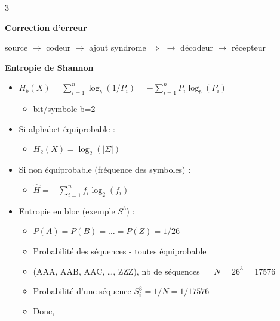 \documentclass[9pt, a4paper, twoside]{article}
\begin{document}
\begin{multicols}{3}
\begin{flushleft}
    \scriptsize \textbf{Correction d'erreur}
\end{flushleft}

\begin{flushleft}
    \scriptsize source $\rightarrow$ codeur $\rightarrow$ ajout syndrome $\Rightarrow$  $\rightarrow$ décodeur $\rightarrow$ récepteur
\end{flushleft}

\begin{flushleft}
    \scriptsize \textbf{Entropie de Shannon}
\end{flushleft}

\begin{itemize}[leftmargin=0.0em,label={}]
    \item \scriptsize $H_{b}(X) = \sum_{i=1}^{n} \log_{b}(1/P_{i}) = -\sum_{i=1}^{n} P_{i} \log_{b}(P_{i})$
    \begin{itemize}[label=$\bullet$]
        \item \scriptsize bit/symbole b=2
    \end{itemize}
    \item \scriptsize Si alphabet équiprobable :
    \begin{itemize}[label={}]
        \item $H_{2}(X) = \log_{2}(\lvert \Sigma \rvert)$
    \end{itemize}
    \item \scriptsize Si non équiprobable (fréquence des symboles) :
    \begin{itemize}[label={}]
        \item \scriptsize $\hat{H} = -\sum_{i=1}^{n} f_{i} \log_{2}(f_{i})$
    \end{itemize}
    \item \scriptsize  Entropie en bloc (exemple \textbf{$S^{3}$}) :
    \begin{itemize}[label=$\bullet$]
        \item \scriptsize $P(A) = P(B) = \ldots = P(Z) = 1/26$
        \item \scriptsize Probabilité des séquences - toutes équiprobable
        \item \scriptsize (AAA, AAB, AAC, \ldots, ZZZ), nb de séquences $= N = 26^{3} = 17576$
        \item \scriptsize Probabilité d'une séquence $S_{i}^{3} = 1/N = 1/17576$
        \item Donc,
    \end{itemize}

\end{itemize}
\end{multicols}
\end{document}
